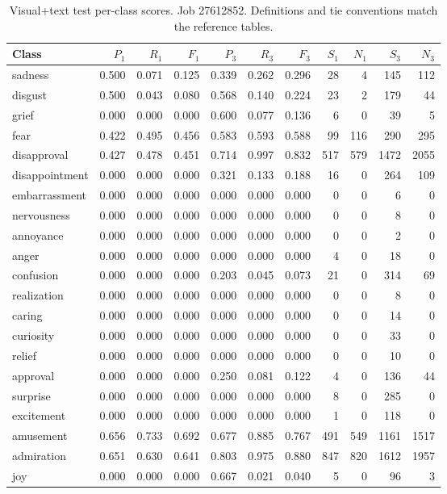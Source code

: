 \begin{table}[!htbp]
\centering
\scriptsize
\setlength{\tabcolsep}{5pt}
\begin{tabular}{lrrrrrrrrrr}
\toprule
Class & $P_1$ & $R_1$ & $F_1$ & $P_3$ & $R_3$ & $F_3$ & $S_1$ & $N_1$ & $S_3$ & $N_3$ \\
\midrule
sadness & 0.500 & 0.071 & 0.125 & 0.339 & 0.262 & 0.296 & 28 & 4 & 145 & 112 \\
disgust & 0.500 & 0.043 & 0.080 & 0.568 & 0.140 & 0.224 & 23 & 2 & 179 & 44 \\
grief & 0.000 & 0.000 & 0.000 & 0.600 & 0.077 & 0.136 & 6 & 0 & 39 & 5 \\
fear & 0.422 & 0.495 & 0.456 & 0.583 & 0.593 & 0.588 & 99 & 116 & 290 & 295 \\
disapproval & 0.427 & 0.478 & 0.451 & 0.714 & 0.997 & 0.832 & 517 & 579 & 1472 & 2055 \\
disappointment & 0.000 & 0.000 & 0.000 & 0.321 & 0.133 & 0.188 & 16 & 0 & 264 & 109 \\
embarrassment & 0.000 & 0.000 & 0.000 & 0.000 & 0.000 & 0.000 & 0 & 0 & 6 & 0 \\
nervousness & 0.000 & 0.000 & 0.000 & 0.000 & 0.000 & 0.000 & 0 & 0 & 8 & 0 \\
annoyance & 0.000 & 0.000 & 0.000 & 0.000 & 0.000 & 0.000 & 0 & 0 & 2 & 0 \\
anger & 0.000 & 0.000 & 0.000 & 0.000 & 0.000 & 0.000 & 4 & 0 & 18 & 0 \\
confusion & 0.000 & 0.000 & 0.000 & 0.203 & 0.045 & 0.073 & 21 & 0 & 314 & 69 \\
realization & 0.000 & 0.000 & 0.000 & 0.000 & 0.000 & 0.000 & 0 & 0 & 8 & 0 \\
caring & 0.000 & 0.000 & 0.000 & 0.000 & 0.000 & 0.000 & 0 & 0 & 14 & 0 \\
curiosity & 0.000 & 0.000 & 0.000 & 0.000 & 0.000 & 0.000 & 0 & 0 & 33 & 0 \\
relief & 0.000 & 0.000 & 0.000 & 0.000 & 0.000 & 0.000 & 0 & 0 & 10 & 0 \\
approval & 0.000 & 0.000 & 0.000 & 0.250 & 0.081 & 0.122 & 4 & 0 & 136 & 44 \\
surprise & 0.000 & 0.000 & 0.000 & 0.000 & 0.000 & 0.000 & 8 & 0 & 285 & 0 \\
excitement & 0.000 & 0.000 & 0.000 & 0.000 & 0.000 & 0.000 & 1 & 0 & 118 & 0 \\
amusement & 0.656 & 0.733 & 0.692 & 0.677 & 0.885 & 0.767 & 491 & 549 & 1161 & 1517 \\
admiration & 0.651 & 0.630 & 0.641 & 0.803 & 0.975 & 0.880 & 847 & 820 & 1612 & 1957 \\
joy & 0.000 & 0.000 & 0.000 & 0.667 & 0.021 & 0.040 & 5 & 0 & 96 & 3 \\
\bottomrule
\end{tabular}
\caption{Visual+text test per-class scores. Job 27612852. Definitions and tie conventions match the reference tables.}
\label{tab:classes-visual_description}
\end{table}
